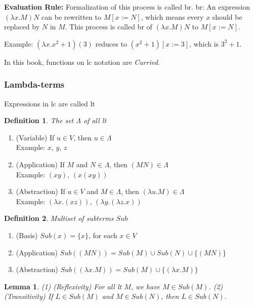 \documentclass[12pt, a4paper]{article}
\newtheorem{definition}{Definition}[section]
\newtheorem{lemma}{Lemma}[section]
\begin{document}
\textbf{Evaluation Rule:} Formalization of this process is called \acrfull{br}. 
\acrshort{br}: An expression $(\lambda x. M)N$ can be rewritten to $M[x := N]$, which means every $x$ should be replaced by $N$ in $M$. This process 
is called \acrshort{br} of $(\lambda x. M)N$ to $M[x := N]$.

Example: $(\lambda x. x^2 + 1)(3)$ reduces to $(x^2 + 1)[x := 3]$, which is $3^2 + 1$.

In this book, functions on \acrshort{lc} notation are \textit{Curried}.

\subsubsection{Lambda-terms}
Expressions in \acrshort{lc} are called \acrfull{lt}

\begin{definition}
    The set $\Lambda$ of all \acrshort{lt}
\end{definition}

\begin{enumerate}
    \item (Variable) If $u \in V$, then $u \in \Lambda$ \\
    Example: $x$, $y$, $z$
    \item (Application) If $M$ and $N \in \Lambda$, then $(MN) \in \Lambda$  \\
    Example: $(x y)$, $(x(x y))$
    \item (Abstraction) If $u \in V$ and $M \in \Lambda$, then $(\lambda u. M) \in \Lambda$  \\
    Example: $(\lambda x. (x z))$, $(\lambda y. (\lambda z. x))$
\end{enumerate}


\begin{definition}
    Multiset of subterms $Sub$
\end{definition}

\begin{enumerate}
    \item (Basis) $Sub(x) = \{x\}$, for each $x \in V$
    \item (Application) $Sub((MN)) = Sub(M) \cup Sub(N) \cup \{(MN)\}$
    \item (Abstraction) $Sub((\lambda x. M)) = Sub(M) \cup \{(\lambda x. M)\}$
\end{enumerate}

\begin{lemma}
    (1) (Reflexivity) For all \acrshort{lt} $M$, we have $M \in Sub(M)$. 
    (2) (Transitivity) If $L \in Sub(M)$ and $M \in Sub(N)$, then $L \in Sub(N)$.
\end{lemma}
\end{document}

